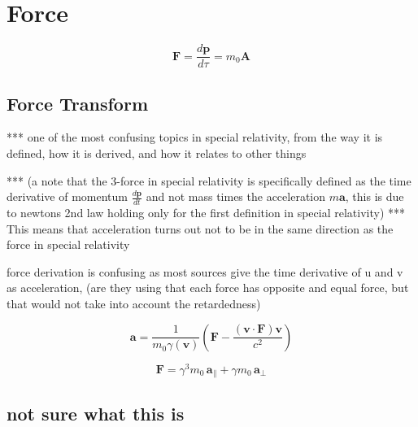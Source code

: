 \section{Force}

\begin{equation}
	\mathbf{F} = \frac{d\mathbf{p}}{d\tau} = m_0\mathbf{A}
\end{equation}

\subsection{Force Transform}

*** one of the most confusing topics in special relativity, from the way it is defined, how it is derived, and how it relates to other things\newline

*** (a note that the 3-force in special relativity is specifically defined as the time derivative of momentum $\frac{d\mathbf{p}}{dt}$ and not mass times the acceleration $m\mathbf{a}$, this is due to newtons 2nd law holding only for the first definition in special relativity) \newline
*** This means that acceleration turns out not to be in the same direction as the force in special relativity\newline

force derivation is confusing as most sources give the time derivative of u and v as acceleration, (are they using that each force has opposite and equal force, but that would not take into account the retardedness)

\begin{equation}
	\mathbf{a} = \frac{1}{m_0 {\gamma}(\mathbf{v})} \left( \mathbf{F}-\frac{ ( \mathbf{v} \cdot \mathbf{F} ) \mathbf{v} }{{c}^2} \right)
\end{equation}

\begin{equation}
	\mathbf{F} = {\gamma}^3 m_0 \, \mathbf{a}_\parallel + {\gamma} m_0 \, \mathbf{a}_\perp
\end{equation}

\subsection{not sure what this is}

